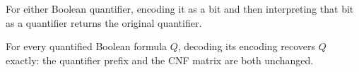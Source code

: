 \begin{theorem}
\label{Complexity.QBF.quantOfBit_quantBit}
\leanok
{}
For either Boolean quantifier, encoding it as a bit and then interpreting that bit as a
quantifier returns the original quantifier.
\end{theorem}

\begin{theorem}
\label{Complexity.QBF.decode_encode}
\leanok
{}
For every quantified Boolean formula $Q$, decoding its encoding recovers $Q$ exactly:
the quantifier prefix and the CNF matrix are both unchanged.
\end{theorem}
